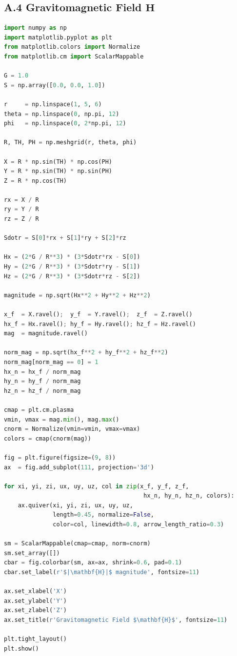 \documentclass[12pt, a4paper]{article}
\theoremstyle{plain}
\theoremstyle{definition}
\theoremstyle{remark}
\begin{document}
\subsection*{A.4 Gravitomagnetic Field $\mathbf{H}$}

\begin{lstlisting}[language=Python]
import numpy as np
import matplotlib.pyplot as plt
from matplotlib.colors import Normalize
from matplotlib.cm import ScalarMappable

G = 1.0
S = np.array([0.0, 0.0, 1.0])

r     = np.linspace(1, 5, 6)
theta = np.linspace(0, np.pi, 12)
phi   = np.linspace(0, 2*np.pi, 12)

R, TH, PH = np.meshgrid(r, theta, phi)

X = R * np.sin(TH) * np.cos(PH)
Y = R * np.sin(TH) * np.sin(PH)
Z = R * np.cos(TH)

rx = X / R
ry = Y / R
rz = Z / R

Sdotr = S[0]*rx + S[1]*ry + S[2]*rz

Hx = (2*G / R**3) * (3*Sdotr*rx - S[0])
Hy = (2*G / R**3) * (3*Sdotr*ry - S[1])
Hz = (2*G / R**3) * (3*Sdotr*rz - S[2])

magnitude = np.sqrt(Hx**2 + Hy**2 + Hz**2)

x_f  = X.ravel();  y_f  = Y.ravel();  z_f  = Z.ravel()
hx_f = Hx.ravel(); hy_f = Hy.ravel(); hz_f = Hz.ravel()
mag  = magnitude.ravel()

norm_mag = np.sqrt(hx_f**2 + hy_f**2 + hz_f**2)
norm_mag[norm_mag == 0] = 1
hx_n = hx_f / norm_mag
hy_n = hy_f / norm_mag
hz_n = hz_f / norm_mag

cmap = plt.cm.plasma
vmin, vmax = mag.min(), mag.max()
cnorm = Normalize(vmin=vmin, vmax=vmax)
colors = cmap(cnorm(mag))

fig = plt.figure(figsize=(9, 8))
ax  = fig.add_subplot(111, projection='3d')

for xi, yi, zi, ux, uy, uz, col in zip(x_f, y_f, z_f,
                                        hx_n, hy_n, hz_n, colors):
    ax.quiver(xi, yi, zi, ux, uy, uz,
              length=0.45, normalize=False,
              color=col, linewidth=0.8, arrow_length_ratio=0.3)

sm = ScalarMappable(cmap=cmap, norm=cnorm)
sm.set_array([])
cbar = fig.colorbar(sm, ax=ax, shrink=0.6, pad=0.1)
cbar.set_label(r'$|\mathbf{H}|$ magnitude', fontsize=11)

ax.set_xlabel('X')
ax.set_ylabel('Y')
ax.set_zlabel('Z')
ax.set_title(r'Gravitomagnetic Field $\mathbf{H}$', fontsize=11)

plt.tight_layout()
plt.show()
\end{lstlisting}
\end{document}
